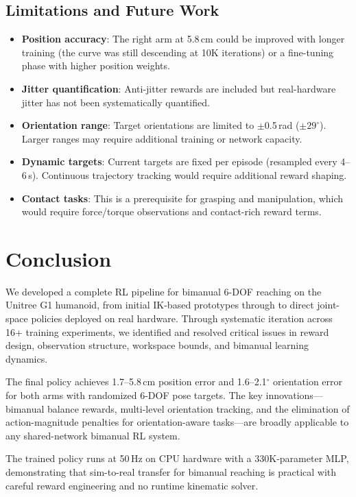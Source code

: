 \documentclass[11pt,a4paper]{article}
\begin{document}
\subsection{Limitations and Future Work}
\begin{itemize}[nosep]
  \item \textbf{Position accuracy}: The right arm at 5.8\,cm could be improved with longer training (the curve was still descending at 10K iterations) or a fine-tuning phase with higher position weights.
  \item \textbf{Jitter quantification}: Anti-jitter rewards are included but real-hardware jitter has not been systematically quantified.
  \item \textbf{Orientation range}: Target orientations are limited to $\pm$0.5\,rad ($\pm 29^\circ$). Larger ranges may require additional training or network capacity.
  \item \textbf{Dynamic targets}: Current targets are fixed per episode (resampled every 4--6\,s). Continuous trajectory tracking would require additional reward shaping.
  \item \textbf{Contact tasks}: This is a prerequisite for grasping and manipulation, which would require force/torque observations and contact-rich reward terms.
\end{itemize}

\section{Conclusion}
\label{sec:conclusion}

We developed a complete RL pipeline for bimanual 6-DOF reaching on the Unitree G1 humanoid, from initial IK-based prototypes through to direct joint-space policies deployed on real hardware. Through systematic iteration across 16+ training experiments, we identified and resolved critical issues in reward design, observation structure, workspace bounds, and bimanual learning dynamics.

The final policy achieves 1.7--5.8\,cm position error and 1.6--2.1$^\circ$ orientation error for both arms with randomized 6-DOF pose targets. The key innovations---bimanual balance rewards, multi-level orientation tracking, and the elimination of action-magnitude penalties for orientation-aware tasks---are broadly applicable to any shared-network bimanual RL system.

The trained policy runs at 50\,Hz on CPU hardware with a 330K-parameter MLP, demonstrating that sim-to-real transfer for bimanual reaching is practical with careful reward engineering and no runtime kinematic solver.
\end{document}
